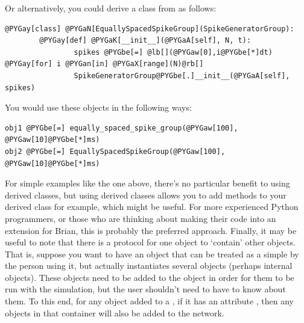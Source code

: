 \documentclass[letterpaper,10pt]{manual}
\begin{document}
Or alternatively, you could derive a class from \hyperlink{brian.SpikeGeneratorGroup}{}
as follows:

\begin{Verbatim}[commandchars=@\[\]]
@PYGay[class] @PYGaN[EquallySpacedSpikeGroup](SpikeGeneratorGroup):
        @PYGay[def] @PYGaK[__init__](@PYGaA[self], N, t):
                spikes @PYGbe[=] @lb[](@PYGaw[0],i@PYGbe[*]dt) @PYGay[for] i @PYGan[in] @PYGaX[range](N)@rb[]
                SpikeGeneratorGroup@PYGbe[.]__init__(@PYGaA[self], spikes)
\end{Verbatim}

You would use these objects in the following ways:

\begin{Verbatim}[commandchars=@\[\]]
obj1 @PYGbe[=] equally_spaced_spike_group(@PYGaw[100], @PYGaw[10]@PYGbe[*]ms)
obj2 @PYGbe[=] EquallySpacedSpikeGroup(@PYGaw[100], @PYGaw[10]@PYGbe[*]ms)
\end{Verbatim}

For simple examples like the one above, there's no particular benefit to
using derived classes, but using derived classes allows you to add
methods to your derived class for example, which might be useful. For
more experienced Python programmers, or those who are thinking about
making their code into an extension for Brian, this is probably the
preferred approach.
Finally, it may be useful to note that there is a protocol for one object
to `contain' other objects. That is, suppose you want to have an object
that can be treated as a simple \hyperlink{brian.NeuronGroup}{} by the person using it,
but actually instantiates several objects (perhaps internal \hyperlink{brian.Connection}{}
objects). These objects need to be added to the \hyperlink{brian.Network}{} object
in order for them to be run with the simulation, but the user shouldn't need
to have to know about them. To this end, for any object added to a
\hyperlink{brian.Network}{}, if it has an attribute , then any
objects in that container will also be added to the network.
\renewcommand{\indexname}{Module Index}\printmodindex\renewcommand{\indexname}{Index}

\printindex
\end{document}
